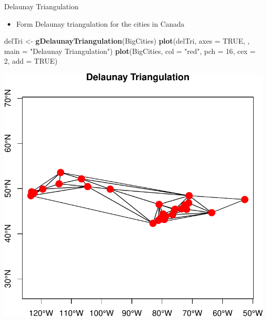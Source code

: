 \documentclass[10pt,ignorenonframetext,]{beamer}
\newenvironment{Shaded}{\begin{snugshade}}{\end{snugshade}}
\newcommand{\KeywordTok}[1]{\textcolor[rgb]{0.13,0.29,0.53}{\textbf{{#1}}}}
\newcommand{\DataTypeTok}[1]{\textcolor[rgb]{0.13,0.29,0.53}{{#1}}}
\newcommand{\DecValTok}[1]{\textcolor[rgb]{0.00,0.00,0.81}{{#1}}}
\newcommand{\StringTok}[1]{\textcolor[rgb]{0.31,0.60,0.02}{{#1}}}
\newcommand{\OtherTok}[1]{\textcolor[rgb]{0.56,0.35,0.01}{{#1}}}
\newcommand{\NormalTok}[1]{{#1}}
\providecommand{\tightlist}{%
  \setlength{\itemsep}{0pt}\setlength{\parskip}{0pt}}
\begin{document}
\begin{frame}[fragile]{Delaunay Triangulation}

\begin{itemize}
\tightlist
\item
  Form Delaunay triangulation for the cities in Canada
\end{itemize}

\begin{Shaded}
\begin{Highlighting}[]
\NormalTok{delTri <-}\StringTok{ }\KeywordTok{gDelaunayTriangulation}\NormalTok{(BigCities)}
\KeywordTok{plot}\NormalTok{(delTri, }\DataTypeTok{axes =} \OtherTok{TRUE}\NormalTok{, , }\DataTypeTok{main =} \StringTok{"Delaunay Triangulation"}\NormalTok{)}
\KeywordTok{plot}\NormalTok{(BigCities, }\DataTypeTok{col =} \StringTok{"red"}\NormalTok{, }\DataTypeTok{pch =} \DecValTok{16}\NormalTok{, }\DataTypeTok{cex =} \DecValTok{2}\NormalTok{, }\DataTypeTok{add =} \OtherTok{TRUE}\NormalTok{)}
\end{Highlighting}
\end{Shaded}

\begin{center}\includegraphics[width=0.5\linewidth]{SpatialDataLecture_files/figure-beamer/delaunay_tri-1} \end{center}

\end{frame}
\end{document}
